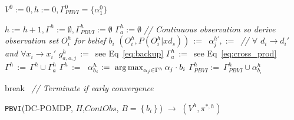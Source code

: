 \documentclass{article} %
\def\argmax{\operatornamewithlimits{arg\max}}
\begin{document}
\incmargin{.5em}
\linesnumbered
\begin{algorithm}[t!]
\vspace{-.5mm}
\dontprintsemicolon
{}
\Begin
{
   $V^0:=0, h:=0, \Gamma_{PBVI}^0 = \{ \alpha_1^0 \} $\;
   {
       $h:=h+1, \Gamma^h :=\emptyset, \Gamma_{PBVI}^h :=\emptyset$\;
       {
      	 {
			$\Gamma_{a}^h :=\emptyset$ \;       		
       			{\emph{// Continuous observation so derive observation set $O_i^h$ for belief $b_i$} \;
			  $(O_i^h,P(O_i^h|xd_{s})) \,:=\,$ \;}
       		 {
       			{
   	 		  		$\alpha_j^{h'},:=\,$  
   	 		  		\emph{// $\forall$ $d_i \to d_i'$ and $\forall x_i \to x_i'$} \; 
   	 		    	{$g_{a,o,j}^h \,:=\, $ see Eq~\eqref{eq:backup}}
       	      	}
       	     }
            $\Gamma_a^{h} \,:=\, $ see Eq~\eqref{eq:cross_prod}\;
            $\Gamma^{h} \,:=\, \Gamma^{h} \cup \Gamma_a^{h}$\;
       	 }  
              $\Gamma^h \,:=\, $ \;
      }
      {
     	$\alpha_{b_i}^h :=\ \argmax_{\alpha_j \in \Gamma^h} \alpha_j \cdot b_i$\;
     	$\Gamma_{PBVI}^h :=\ \Gamma_{PBVI}^h \cup \alpha_{b_i}^h$\;
      }

           {break $\,$ \emph{// Terminate if early convergence}\;}
   }
      \;
}
\caption{\footnotesize \texttt{PBVI}(DC-POMDP, $H$,$ContObs$, $B=\left\{b_i \right\}$) $\longrightarrow$ $(V^h,\pi^{*,h})$ \label{alg:vi}}
\vspace{-1mm}
\end{algorithm}
\decmargin{.5em}
\end{document}
